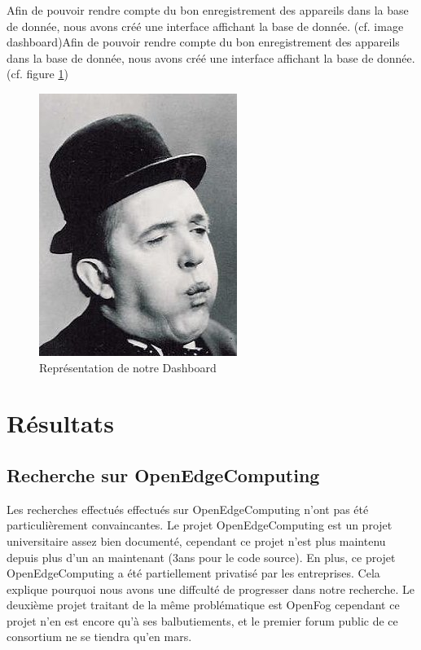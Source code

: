 \documentclass[twocolumn,a4paper]{IEEEtranfr}
\begin{document}
Afin de pouvoir rendre compte du bon enregistrement des appareils dans la base de donnée, nous avons créé une interface affichant la base de donnée. (cf. image dashboard)Afin de pouvoir rendre compte du bon enregistrement des appareils dans la base de donnée, nous avons créé une interface affichant la base de donnée. (cf. figure \ref{fig:dashboard})

\begin{figure}[htpb]
  \begin{center}
    \includegraphics[width=0.7\columnwidth] {../images/SLaurel.jpg}
  \end{center}
  \caption{Représentation de notre Dashboard}
  \label{fig:dashboard}
\end{figure}

\section{Résultats}

\subsection{Recherche sur OpenEdgeComputing}

Les recherches effectués effectués sur OpenEdgeComputing n’ont pas été particulièrement convaincantes. Le projet OpenEdgeComputing est un projet universitaire assez bien documenté, cependant ce projet n’est plus maintenu depuis plus d’un an maintenant (3ans pour le code source). En plus, ce projet OpenEdgeComputing a été partiellement privatisé par les entreprises. Cela explique pourquoi nous avons une diffculté de progresser dans notre recherche. Le deuxième projet traitant de la même problématique est OpenFog cependant ce projet n’en est encore qu'à ses balbutiements, et le premier forum public de ce consortium ne se tiendra qu’en mars. 
\end{document}
